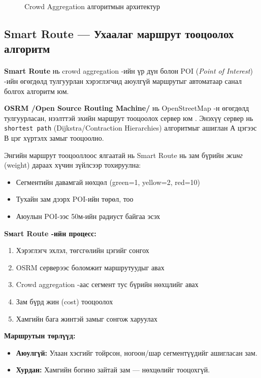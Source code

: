 \begin{figure}[H]
    \centering
    \caption{Crowd Aggregation алгоритмын архитектур}
    \label{fig:crowdAgg}
\end{figure}

\subsection{Smart Route — Ухаалаг маршрут тооцоолох алгоритм}
\paragraph{}
\textbf{Smart Route} нь crowd aggregation -ийн үр дүн болон POI (\textit{Point of Interest}) -ийн өгөгдөлд тулгуурлан хэрэглэгчид аюулгүй маршрутыг автоматаар санал болгох алгоритм юм.

\textbf{OSRM /Open Source Routing Machine/} нь OpenStreetMap -н өгөгдөлд тулгуурласан, нээлттэй эхийн маршрут тооцоолох сервер юм \cite{osrm}. Энэхүү сервер нь \texttt{shortest path} (Dijkstra/Contraction Hierarchies) алгоритмыг ашиглан А цэгээс В цэг хүртэлх замыг тооцоолно.

Энгийн маршрут тооцооллоос ялгаатай нь Smart Route нь зам бүрийн \emph{жинг} (weight) дараах хүчин зүйлсээр тохируулна:
\begin{itemize}
    \item Сегментийн давамгай нөхцөл (green=1, yellow=2, red=10)
    \item Тухайн зам дээрх POI-ийн төрөл, тоо
    \item Аюулын POI-ээс 50м-ийн радиуст байгаа эсэх
\end{itemize}

\textbf{Sмart Route -ийн процесс:}
\begin{enumerate}
    \item Хэрэглэгч эхлэл, төгсгөлийн цэгийг сонгох
    \item OSRM серверээс боломжит маршрутуудыг авах
    \item Crowd aggregation -аас сегмент тус бүрийн нөхцлийг авах
    \item Зам бүрд жин (cost) тооцоолох
    \item Хамгийн бага жинтэй замыг сонгож харуулах
\end{enumerate}

\textbf{Маршрутын төрлүүд:}
\begin{itemize}
    \item \textbf{Аюулгүй: }Улаан хэсгийг тойрсон, ногоон/шар сегментүүдийг ашигласан зам.
    \item \textbf{Хурдан: }Хамгийн богино зайтай зам — нөхцөлийг тооцохгүй.
\end{itemize}

